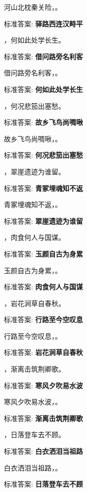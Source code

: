 \documentclass[12pt, a4paper, addpoints]{exam}
\begin{document}
\begin{questions}
\question[1] 河山北枕秦关险，\uline{\qquad\qquad\qquad}。

标准答案: \textbf{驿路西连汉畤平}

\question[1] \uline{\qquad\qquad\qquad}，何如此处学长生。

标准答案: \textbf{借问路旁名利客}

\question[1] 借问路旁名利客，\uline{\qquad\qquad\qquad}。

标准答案: \textbf{何如此处学长生}

\question[1] \uline{\qquad\qquad\qquad}，何况悲笳出塞愁。

标准答案: \textbf{故乡飞鸟尚啁啾}

\question[1] 故乡飞鸟尚啁啾，\uline{\qquad\qquad\qquad}。

标准答案: \textbf{何况悲笳出塞愁}

\question[1] \uline{\qquad\qquad\qquad}，翠崖遗迹为谁留。

标准答案: \textbf{青冢埋魂知不返}

\question[1] 青冢埋魂知不返，\uline{\qquad\qquad\qquad}。

标准答案: \textbf{翠崖遗迹为谁留}

\question[1] \uline{\qquad\qquad\qquad}，肉食何人与国谋。

标准答案: \textbf{玉颜自古为身累}

\question[1] 玉颜自古为身累，\uline{\qquad\qquad\qquad}。

标准答案: \textbf{肉食何人与国谋}

\question[1] \uline{\qquad\qquad\qquad}，岩花涧草自春秋。

标准答案: \textbf{行路至今空叹息}

\question[1] 行路至今空叹息，\uline{\qquad\qquad\qquad}。

标准答案: \textbf{岩花涧草自春秋}

\question[1] \uline{\qquad\qquad\qquad}，渐离击筑荆卿歌。

标准答案: \textbf{寒风夕吹易水波}

\question[1] 寒风夕吹易水波，\uline{\qquad\qquad\qquad}。

标准答案: \textbf{渐离击筑荆卿歌}

\question[1] \uline{\qquad\qquad\qquad}，日落登车去不顾。

标准答案: \textbf{白衣洒泪当祖路}

\question[1] 白衣洒泪当祖路，\uline{\qquad\qquad\qquad}。

标准答案: \textbf{日落登车去不顾}


\end{questions}
\end{document}
